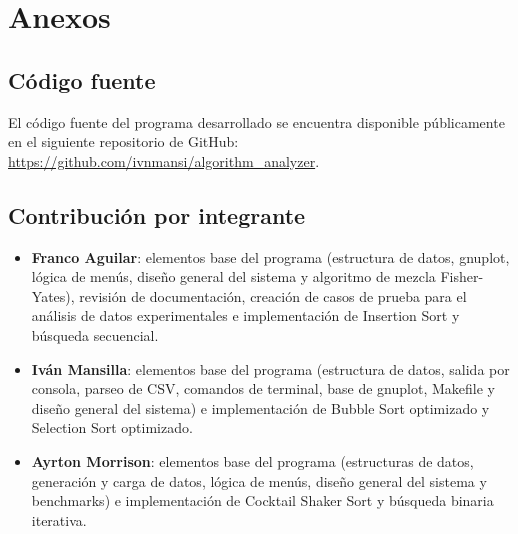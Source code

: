\chapter{Anexos}

\section{Código fuente}
El código fuente del programa desarrollado se encuentra disponible públicamente en el siguiente repositorio de GitHub: \url{https://github.com/ivnmansi/algorithm_analyzer}.

\section{Contribución por integrante}
\begin{itemize}
    \item \textbf{Franco Aguilar}: elementos base del programa (estructura de datos, gnuplot, lógica de menús, diseño general del sistema y algoritmo de mezcla Fisher-Yates), revisión de documentación, creación de casos de prueba para el análisis de datos experimentales e implementación de Insertion Sort y búsqueda secuencial.
    \item \textbf{Iván Mansilla}: elementos base del programa (estructura de datos, salida por consola, parseo de CSV, comandos de terminal, base de gnuplot, Makefile y diseño general del sistema) e implementación de Bubble Sort optimizado y Selection Sort optimizado.
    \item \textbf{Ayrton Morrison}: elementos base del programa (estructuras de datos, generación y carga de datos, lógica de menús, diseño general del sistema y benchmarks) e implementación de Cocktail Shaker Sort y búsqueda binaria iterativa.
\end{itemize}
